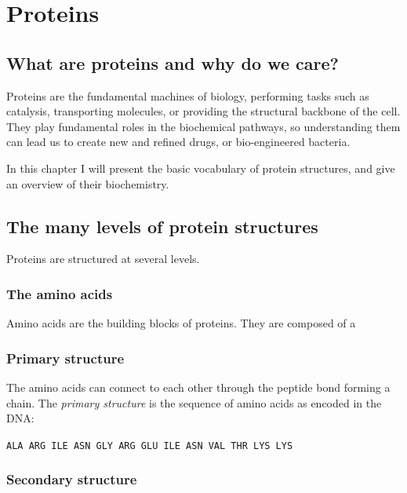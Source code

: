 \chapter{Proteins}
\section{What are proteins and why do we care?}
Proteins are the fundamental machines of biology, performing tasks such as catalysis, transporting molecules, or providing the structural backbone of the cell.
They play fundamental roles in the biochemical pathways, so understanding them can lead us to create new and refined drugs,
or bio-engineered bacteria.

In this chapter I will present the basic vocabulary of protein structures, and give an overview of their biochemistry.

\section{The many levels of protein structures}
Proteins are structured at several levels.
\subsection{The amino acids}
Amino acids are the building blocks of proteins.
They are composed of a

\label{fig:amino_acid}

\subsection{Primary structure}
The amino acids can connect to each other through the peptide bond forming a chain.
The \emph{primary structure} is the sequence of amino acids as encoded in the DNA:
\begin{center}
\texttt{ALA ARG ILE ASN GLY ARG GLU ILE ASN VAL THR LYS LYS}
\end{center}

\subsection{Secondary structure}

